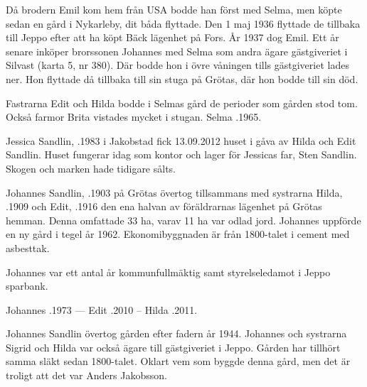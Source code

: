 Då brodern Emil kom hem från USA bodde han först med Selma, men köpte sedan en gård i Nykarleby, dit båda flyttade. Den 1 maj 1936 flyttade de tillbaka till Jeppo efter att ha köpt Bäck lägenhet på Fors. År 1937 dog Emil. Ett år senare inköper brorssonen Johannes med Selma som andra ägare gästgiveriet i Silvast (karta 5, nr 380). Där bodde hon i övre våningen tills gästgiveriet lades ner. Hon flyttade då tillbaka till sin stuga på Grötas, där hon bodde till sin död.

Fastrarna Edit och Hilda bodde i Selmas gård de perioder som gården stod tom. Också farmor Brita vistades mycket i stugan. Selma .1965.



%



%
Jessica Sandlin, .1983 i Jakobstad fick 13.09.2012 huset i gåva av Hilda och Edit Sandlin. Huset fungerar idag som kontor och lager för Jessicas far, Sten Sandlin. Skogen och marken hade tidigare sålts.\jhvspace{}


%
Johannes Sandlin, .1903 på Grötas övertog tillsammans med systrarna Hilda, .1909 och Edit, .1916 den ena halvan av föräldrarnas lägenhet på Grötas hemman. Denna omfattade 33 ha, varav 11 ha var odlad jord. Johannes uppförde en ny gård i tegel år 1962. Ekonomibyggnaden är från 1800-talet i cement med asbesttak.

Johannes var ett antal år kommunfullmäktig samt styrelseledamot i Jeppo sparbank.

Johannes .1973  ---  Edit .2010  --  Hilda .2011.


%



%
Johannes Sandlin övertog gården efter fadern år 1944. Johannes och systrarna Sigrid och Hilda var också ägare till gästgiveriet i Jeppo. Gården har tillhört samma släkt sedan 1800-talet. Oklart vem som byggde denna gård, men det är troligt att det var Anders Jakobsson.


